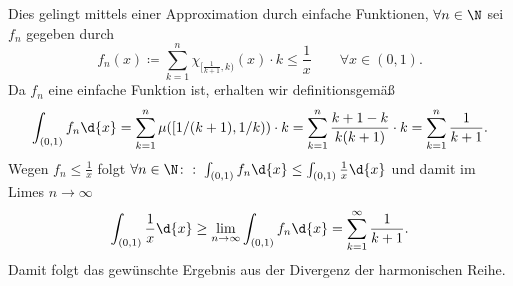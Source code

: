 \documentclass{article}
\begin{document}
    Dies gelingt mittels einer Approximation durch einfache Funktionen, $\forall n \in \N$ sei $f_n$ gegeben durch 
    \[
        f_n(x) \coloneqq  \sum_{k = 1}^{n} \chi_{[\frac{1}{k+1}, k)}(x) \cdot k \leq \frac{1}{x} \qquad \forall x \in (0,1).
    \]
    Da $f_n$ eine einfache Funktion ist, erhalten wir definitionsgemäß
    \[
        \int_{(0,1)} f_n \d{x} = \sum_{k = 1}^{n} \mu([1/(k+1), 1/k)) \cdot k = \sum_{k = 1}^{n} \frac{k+1 - k}{k(k+1)} \cdot k = \sum_{k = 1}^{n} \frac{1}{k+1}.
    \]
    Wegen $f_n \leq \frac{1}{x}$ folgt $\forall n \in \N\colon:\;\int_{(0,1)} f_n \d{x} \leq \int_{(0,1)} \frac{1}{x} \d{x}$ und damit im Limes $n\to \infty$
    \[
        \int_{(0,1)} \frac{1}{x} \d{x} \geq \lim\limits_{n \to \infty} \int_{(0,1)} f_n \d{x} = \sum_{k = 1}^{\infty} \frac{1}{k+1}.
    \]
    Damit folgt das gewünschte Ergebnis aus der Divergenz der harmonischen Reihe.
\end{document}
